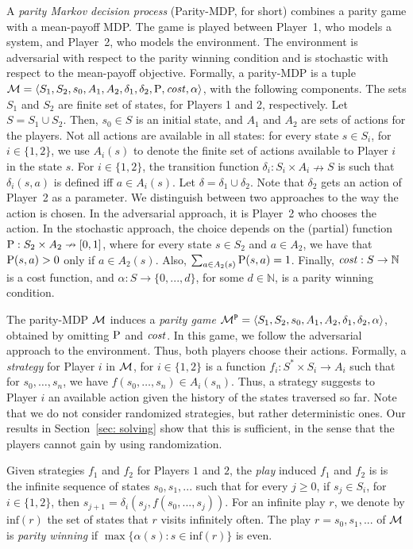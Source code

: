 \documentclass[runningheads,a4paper]{llncs}
\newcommand{\set}[1]{{\{#1\}}}
\newcommand{\Nat}{\mathbb{N}}
\newcommand{\zug}[1]{\langle #1  \rangle}
\newcommand{\M}{{\cal M}}
\renewcommand{\P}{{\mathtt P}}
\newcommand{\maxs}[1]{\max\set{#1}}
\newcommand{\Inf}{\mbox{inf}}
\newcommand{\Act}{A}
\newcommand{\MDPProb}{{\rm P}}
\newcommand{\MDPcost}{{\it cost}}
\begin{document}
A {\em parity Markov decision process\/} (Parity-MDP, for short) combines a parity game with a mean-payoff MDP. The game is played between Player~1, who models a 
system, and Player~2, who models the environment. The environment is adversarial with respect to the parity winning condition and is stochastic with respect to the mean-payoff objective. Formally, a parity-MDP is a tuple
$\M=\zug{S_1, S_2,s_0,\Act_1,\Act_2,\delta_1, \delta_2,\MDPProb,\MDPcost,\alpha}$, with the following components. The sets $S_1$ and $S_2$ are finite set of states, for Players 1 and 2, respectively. Let $S=S_1 \cup S_2$. Then, $s_0\in S$ is an initial state, and $\Act_1$ and $\Act_2$ are sets of actions for the players. Not all actions are available in all states: for every state $s\in S_i$, for $i\in \set{1,2}$, we use $\Act_i(s)$ to denote the finite set of actions available to Player $i$ in the state $s$. 
For $i\in \set{1,2}$, the transition function $\delta_i:S_i\times \Act_i\nrightarrow S$ is such that $\delta_i(s,a)$ is defined iff $a\in \Act_i(s)$. Let $\delta=\delta_1 \cup \delta_2$. 
Note that $\delta_2$ gets an action of Player~2 as a parameter. We distinguish between two approaches to the way the action is chosen. In the adversarial approach, it is Player~2 who chooses the action. In the stochastic approach, the choice depends on the (partial) function $\MDPProb:S_2\times \Act_2\nrightarrow [0,1]$, where for every state $s\in S_2$ and $a \in A_2$, we have that $ \MDPProb(s,a)>0$ only if $a \in A_2(s)$. Also, $\sum_{a\in \Act_2(s)} \MDPProb(s,a)=1$. Finally, $\MDPcost:S\to \Nat$ is a cost function, and  $\alpha:S\to \set{0,...,d}$, for some $d \in \Nat$, is a parity winning condition.

The parity-MDP  $\M$ induces a {\em parity game\/} $\M^{\P}=\zug{S_1, S_2,s_0,\Act_1,\Act_2,\delta_1, \delta_2,\alpha}$, obtained by omitting $\MDPProb$ and $\MDPcost$. In this game, we follow the adversarial approach to the environment. Thus, both players choose their actions. Formally, 
a {\em strategy} for Player $i$  in $\M$, for $i \in \{1,2\}$ is a function $f_i:S^*\times S_i\to \Act_i$ such that for $s_0,\ldots,s_n$, we have $f(s_0,\ldots,s_n)\in \Act_i(s_n)$. Thus, a strategy suggests to Player $i$ an available action given the history of the states traversed so far.  
Note that we do not consider randomized strategies, but rather deterministic ones. 
Our results in Section~\ref{sec: solving} show that this is sufficient, in the sense that the players cannot gain by using randomization.

Given strategies $f_1$ and $f_2$ for Players $1$ and $2$, the {\em play} induced $f_1$ and $f_2$ is 
is the infinite sequence of states $s_0,s_1,...$ such that for every $j\ge 0$, if $s_j\in S_i$, for $i \in \{1,2\}$, then $s_{j+1}=\delta_i(s_{j},f(s_0,...,s_{j}))$. For an infinite play $r$, we denote by $\Inf(r)$ the set of states that $r$ visits infinitely often.
The play $r=s_0,s_1,...$ of $\M$ is {\em parity winning} if $\maxs{\alpha(s): s\in\Inf(r)}$ is even. 
\end{document}
